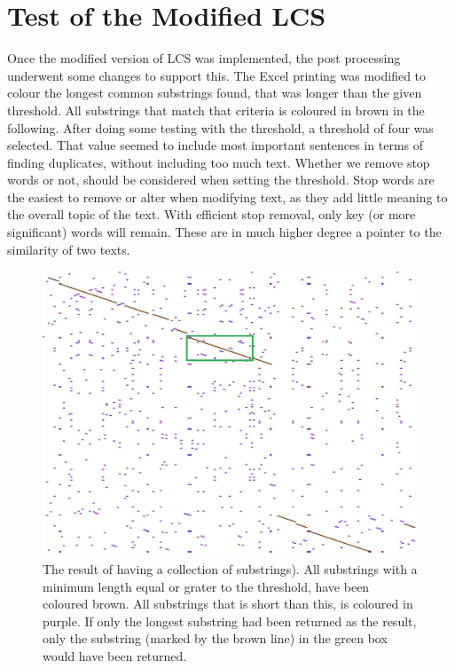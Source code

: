 \section{Test of the Modified LCS}

Once the modified version of LCS was implemented, the post processing underwent some changes to support this. The Excel printing was modified to colour the longest common substrings found, that was longer than the given threshold. All substrings that match that criteria is coloured in brown in the following. After doing some testing with the threshold, a threshold of four was selected. That value seemed to include most important sentences in terms of finding duplicates, without including too much text. Whether we remove stop words or not, should be considered when setting the threshold. Stop words are the easiest to remove or alter when modifying text, as they add little meaning to the overall topic of the text. With efficient stop removal, only key (or more significant) words will remain. These are in much higher degree a pointer to the similarity of two texts.

\begin{figure}
	\centering
	\includegraphics[scale=0.35]{figures/SubstringCollection}
	\caption{The result of having a collection of substrings). All substrings with a minimum length equal or grater to the threshold, have been coloured brown. All substrings that is short than this, is coloured in purple. If only the longest substring had been returned as the result, only the substring (marked by the brown line) in the green box would have been returned.}
	\label{SubstringsEx}
\end{figure}

